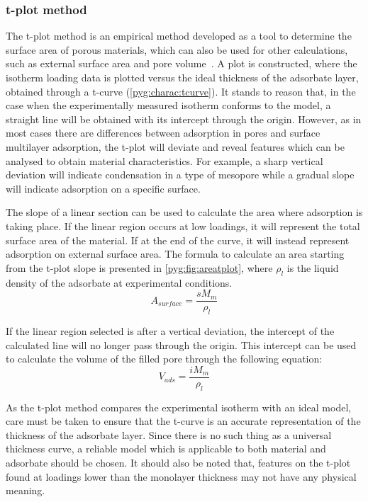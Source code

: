 \subsubsection{t-plot method}\label{pyg:charac:tplot}

The t-plot method is an empirical method developed as a
tool to determine the surface area of porous materials,
which can also be used for other calculations, such as
external surface area and pore volume~\cite{lippensStudiesPoreSystems1965}.
A plot is constructed, where the isotherm loading
data is plotted versus the ideal thickness of the adsorbate layer,
obtained through a t-curve (\autoref{pyg:charac:tcurve}).
It stands to reason that, in the case when the experimentally measured
isotherm conforms to the model, a straight line will be obtained with its
intercept through the origin. However, as in most cases there
are differences between adsorption in pores and surface multilayer
adsorption, the t-plot will deviate and reveal features which can
be analysed to obtain material characteristics. For example, a sharp
vertical deviation will indicate condensation in a type of mesopore
while a gradual slope will indicate adsorption on a specific surface.

The slope of a linear section can be used to calculate the area where
adsorption is taking place. If the linear region occurs at low loadings,
it will represent the total surface area of the material.
If at the end of the curve, it will instead represent adsorption on
external surface area. The formula to calculate an area starting
from the t-plot slope is presented in \autoref{pyg:fig:areatplot},
where \(\rho_{l}\) is the liquid density of the adsorbate at experimental
conditions.
%
\begin{equation}\label{pyg:fig:areatplot}
	A_{surface} = \frac{s M_m}{\rho_{l}}
\end{equation}

If the linear region selected is after a vertical deviation,
the intercept of the calculated line will no longer pass through
the origin. This intercept can be used to calculate the volume of
the filled pore through the following equation:
%
\begin{equation}
	V_{ads} = \frac{i M_m}{\rho_{l}}
\end{equation}

As the t-plot method compares the experimental isotherm
with an ideal model, care must be taken to ensure that the t-curve
is an accurate representation of the thickness of the adsorbate layer.
Since there is no such thing as a universal thickness curve,
a reliable model which is applicable to both material and adsorbate
should be chosen. It should also be noted that, features on the t-plot
found at loadings lower than the monolayer thickness may not have any
physical meaning.

